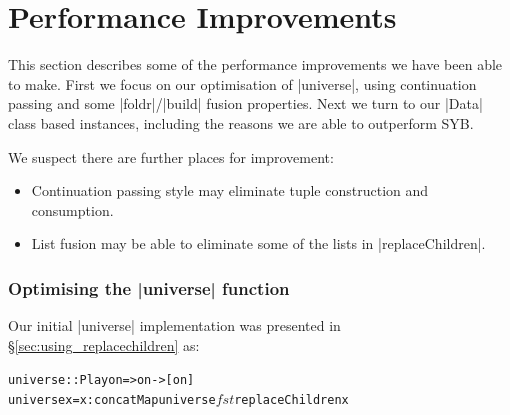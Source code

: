\documentclass[preprint]{sigplanconf}
\newenvironment{code}{\begin{alltt}\small}{\end{alltt}}
\begin{document}

\section{Performance Improvements}
\label{sec:performance}

This section describes some of the performance improvements we have been able to make. First we focus on our optimisation of |universe|, using continuation passing and some |foldr|/|build| fusion properties. Next we turn to our |Data| class based instances, including the reasons we are able to outperform SYB.

We suspect there are further places for improvement:

\begin{itemize}
\item Continuation passing style may eliminate tuple construction and consumption.
\item List fusion may be able to eliminate some of the lists in |replaceChildren|.
\end{itemize}

\subsubsection{Optimising the |universe| function}
\label{sec:optimise_everything}

Our initial |universe| implementation was presented in \S\ref{sec:using_replacechildren} as:

\begin{code}
universe :: Play on => on -> [on]
universe x = x : concatMap universe $ fst $ replaceChildren x
\end{code}
\end{document}
